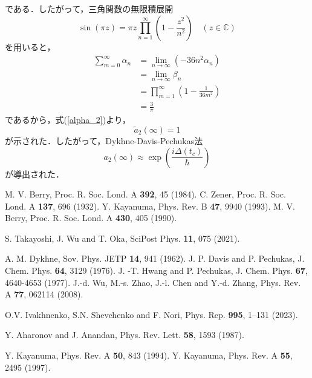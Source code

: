 \documentclass[a4paper, titlepage]{jsreport}
\begin{document}
である．したがって，三角関数の無限積展開
\begin{equation}
  \sin (\pi z) = \pi z \prod_{n=1}^{\infty} \left( 1-\frac{z^2}{n^2} \right) \quad (z \in \mathbb{C})
\end{equation}
を用いると，
\begin{align}
  \sum_{m=0}^{\infty} \alpha_n &= \lim_{n \rightarrow \infty} (-36n^2 \alpha_n)\\
  &= \lim_{n \rightarrow \infty} \beta_n\\
  &= \prod_{m=1}^{\infty} \left( 1-\frac{1}{36m^2} \right)\\
  &= \frac{3}{\pi}
\end{align}
であるから，式(\ref{alpha_2})より，
\begin{equation}
  \tilde{a}_2(\infty) = 1
\end{equation}
が示された．したがって，Dykhne-Davis-Pechukas法
\begin{equation}
  a_2(\infty) \approx \exp \left( \frac{i\Delta(t_c)}{\hbar} \right)
\end{equation}
が導出された．



\begin{thebibliography}{99}
    M. V. Berry, Proc. R. Soc. Lond. A {\bf 392}, 45 (1984).
   C. Zener, Proc. R. Soc. Lond. A {\bf 137}, 696 (1932).
    Y. Kayanuma, Phys. Rev. B {\bf 47}, 9940 (1993).
    M. V. Berry, Proc. R. Soc. Lond. A {\bf 430}, 405 (1990).

     S. Takayoshi, J. Wu and T. Oka, SciPost Phys. {\bf 11}, 075 (2021).
  
        A. M. Dykhne, Sov. Phys. JETP {\bf 14}, 941 (1962).
   J. P. Davis and P. Pechukas, J. Chem. Phys. {\bf 64}, 3129 (1976).
   J. -T. Hwang and P. Pechukas, J. Chem. Phys. {\bf 67}, 4640-4653 (1977).
   J.-d. Wu, M.-s. Zhao, J.-l. Chen and Y.-d. Zhang, Phys. Rev. A {\bf 77}, 062114 (2008).

     O.V. Ivakhnenko, S.N. Shevchenko and F. Nori, Phys. Rep. {\bf 995}, 1–131 (2023).
 

     Y. Aharonov and J. Anandan, Phys. Rev. Lett. {\bf 58}, 1593 (1987).

   Y. Kayanuma, Phys. Rev. A {\bf 50}, 843 (1994).
   Y. Kayanuma, Phys. Rev. A {\bf 55}, 2495 (1997).
\end{thebibliography}
\end{document}
